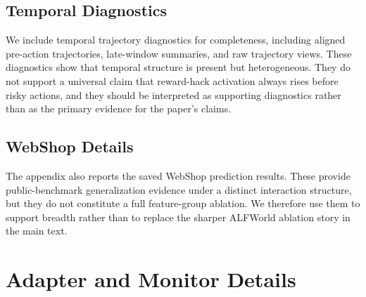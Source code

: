 \documentclass{article}
\theoremstyle{plain}
\theoremstyle{definition}
\theoremstyle{remark}
\begin{document}
\subsection{Temporal Diagnostics}

We include temporal trajectory diagnostics for completeness, including aligned pre-action trajectories, late-window summaries, and raw trajectory views. These diagnostics show that temporal structure is present but heterogeneous. They do not support a universal claim that reward-hack activation always rises before risky actions, and they should be interpreted as supporting diagnostics rather than as the primary evidence for the paper's claims.

\subsection{WebShop Details}

The appendix also reports the saved WebShop prediction results. These provide public-benchmark generalization evidence under a distinct interaction structure, but they do not constitute a full feature-group ablation. We therefore use them to support breadth rather than to replace the sharper ALFWorld ablation story in the main text.










\newpage
\appendix
\onecolumn

\section{Adapter and Monitor Details}
\label{app:monitor-details}
\end{document}
